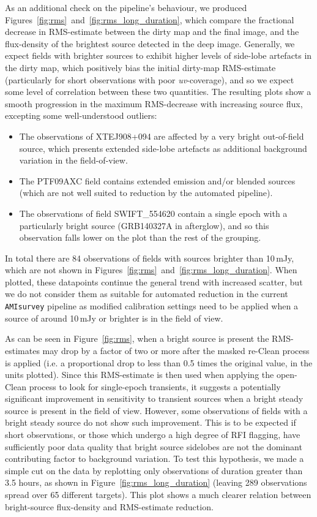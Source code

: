 \documentclass[5p,authoryear]{elsarticle}
\begin{document}
As an additional check on the pipeline's behaviour, we produced Figures~\ref{fig:rms}~and~\ref{fig:rms_long_duration}, which compare the fractional decrease in RMS-estimate between the dirty map and the final image, and the flux-density of the brightest source detected in the deep image. 
Generally, we expect fields with brighter sources to exhibit higher levels of side-lobe artefacts in the dirty map, which positively bias the initial dirty-map RMS-estimate (particularly for short observations with poor \textit{uv}-coverage), and so we expect some level of correlation between these two quantities. 
The resulting plots show a smooth progression in the maximum RMS-decrease with increasing source flux, excepting some well-understood outliers:
\begin{itemize}
   \item The observations of XTEJ908+094 are affected by a very bright out-of-field source, which presents extended side-lobe artefacts as additional background variation in the field-of-view.
   \item The PTF09AXC field contains extended emission and/or blended sources (which are not well suited to reduction by the automated pipeline).
   \item The observations of field SWIFT\_554620 contain a single epoch with a particularly bright source (GRB140327A in afterglow), and so this observation falls lower on the  plot than the rest of the grouping.
\end{itemize}
In total there are 84 observations of fields with sources brighter than 10\,mJy, which are not shown in Figures~\ref{fig:rms}~and~\ref{fig:rms_long_duration}.
When plotted, these datapoints continue the general trend with increased scatter, but we do not consider them as suitable for automated reduction in the current \texttt{AMIsurvey} pipeline as modified calibration settings need to be applied when a source of around 10\,mJy or brighter is in the field of view.

As can be seen in Figure~\ref{fig:rms}, when a bright source is present the RMS-estimates may drop by a factor of two or more after the masked re-Clean process is applied (i.e. a proportional drop to less than 0.5 times the original value, in the units plotted). 
Since this RMS-estimate is then used when applying the open-Clean process to look for single-epoch transients, it suggests a potentially significant improvement in sensitivity to transient sources when a bright steady source is present in the field of view. However, some observations of fields with a bright steady source do not show such improvement. This is to be expected if short observations, or those which undergo a high degree of RFI flagging, have sufficiently poor data quality that bright source sidelobes are not the dominant contributing factor to background variation. To test this hypothesis, we made a simple cut on the data by replotting only observations of duration greater than 3.5 hours, as shown in Figure~\ref{fig:rms_long_duration} (leaving 289 observations spread over 65 different targets). This plot shows a much clearer relation between bright-source flux-density and RMS-estimate reduction.
\end{document}
